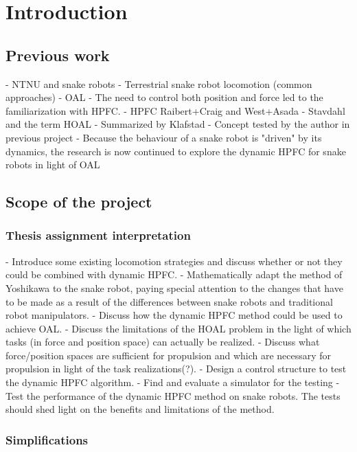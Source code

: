 
\chapter{Introduction}\label{Chapter:introduction}

\section{Previous work}
- NTNU and snake robots
- Terrestrial snake robot locomotion (common approaches)
- OAL
- The need to control both position and force led to the familiarization with HPFC.
- HPFC Raibert+Craig and West+Asada
- Stavdahl and the term HOAL
- Summarized by Klafstad
- Concept tested by the author in previous project
- Because the behaviour of a snake robot is "driven" by its dynamics, the research is now continued to explore the dynamic HPFC for snake robots in light of OAL

\section{Scope of the project}

\subsection{Thesis assignment interpretation}

- Introduce some existing locomotion strategies and discuss whether or not they could be combined with dynamic HPFC.
- Mathematically adapt the method of Yoshikawa to the snake robot, paying special attention to the changes that have to be made as a result of the differences between snake robots and traditional robot manipulators.
- Discuss how the dynamic HPFC method could be used to achieve OAL.
- Discuss the limitations of the HOAL problem in the light of which tasks (in force and position space) can actually be realized.
- Discuss what force/position spaces are sufficient for propulsion and which are necessary for propulsion in light of the task realizations(?).
- Design a control structure to test the dynamic HPFC algorithm.
- Find and evaluate a simulator for the testing
- Test the performance of the dynamic HPFC method on snake robots. The tests should shed light on the benefits and limitations of the method.

\subsection{Simplifications}

